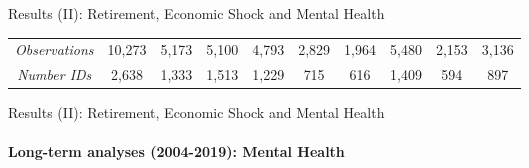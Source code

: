 \documentclass{beamer}
\begin{document}
\begin{frame}{Results (II): Retirement, Economic Shock and Mental Health}
\begin{table}[h]
{\begin{tabular}{@{}lccccccccc@{}}
\multicolumn{1}{c}{\textit{Observations}} & 10,273 & 5,173 & 5,100 & 4,793 & 2,829 & 1,964 & 5,480 & 2,153 & 3,136 \\
\multicolumn{1}{c}{\textit{Number IDs}} & 2,638 & 1,333 & 1,513 & 1,229 & 715 & 616 & 1,409 & 594 & 897 \\\hline
\end{tabular}%
}
\end{table}
    \end{frame}

    \begin{frame}{Results (II): Retirement, Economic Shock and Mental Health}
    \framesubtitle{Long-term analyses (2004-2019): Mental Health}
\begin{table}[h]
\centering

\label{tab6}
\end{table}
\end{frame}
\end{document}
